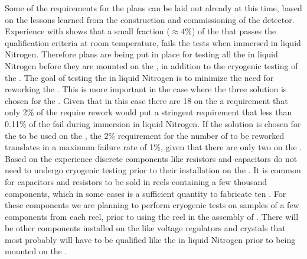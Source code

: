 Some of the requirements for the  plans can
be laid out already at this time, based on the lessons learned
from the construction and commissioning of the 
detector. Experience with  shows that a small fraction
($\approx4$\%) of the   that passes the
qualification criteria at room temperature, fails the tests
when immersed in liquid Nitrogen. Therefore plans are being put
in place for testing all the  in liquid Nitrogen
before they are mounted on the , in addition to the
cryogenic testing of the . The goal of testing 
the  in liquid Nitrogen is to minimize the need
for reworking the . This is more important in the
case where the three  solution is chosen for the
. Given that in this case there are 18  on the
 a requirement that only 2\% of the 
require rework would put a stringent requirement that less than
0.11\% of the  fail during immersion in liquid
Nitrogen. If the  solution is chosen for the 
to be used on the , the 2\% requirement for the
number of  to be reworked translates in a 
maximum failure rate of 1\%, given that there are only two
 on the . Based on the 
experience discrete components like resistors and capacitors
do not need to undergo cryogenic testing prior to their installation
on the . It is common for capacitors and resistors
to be sold in reels containing a few thousand components, which
in some cases is a sufficient quantity to fabricate ten
. For these components we are planning to
perform cryogenic tests on samples of a few components
from each reel, prior to using the reel in the assembly of
. There will be other components installed on
the  like voltage regulators and crystals that
most probably will have to be qualified like the 
in liquid Nitrogen prior to being mounted on the .

